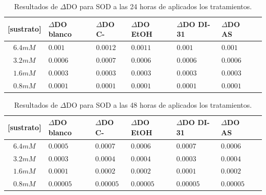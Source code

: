 \begin{table}[h]
	\caption{Resultados de $\Delta$DO para SOD a las 24 horas de aplicados los tratamientos.}
	\label{24hSOD}
	\begin{center}
		\begin{tabular}{|c|M{25mm}|M{25mm}|M{25mm}|M{25mm}|M{25mm}|c|}
			\hline 
			\textbf{[sustrato]} & \textbf{$\Delta$DO blanco} & \textbf{$\Delta$DO C-} & \textbf{$\Delta$DO EtOH} & \textbf{$\Delta$DO DI-31} & \textbf{$\Delta$DO AS} \\ 
			\hline 
			$6.4mM$ &  $0.001$ & $0.0012$  & $0.0011$ & $0.001$ & $0.001$ \\ 
			\hline 
			$3.2mM$ &  $0.0006$ & $0.0007$  & $0.0006$ & $0.0006$ & $0.0006$ \\ 
			\hline 
			$1.6mM$ &  $0.0003$ & $0.0003$  & $0.0003$ & $0.0003$ & $0.0003$ \\
			\hline 
			$0.8mM$ &  $0.0001$ & $0.0001$  & $0.0001$ & $0.0001$ & $0.0001$ \\
			\hline
		\end{tabular} 
	\end{center}
\end{table}

\normalsize

\begin{table}[h]
	\caption{Resultados de $\Delta$DO para SOD a las 48 horas de aplicados los tratamientos.}
	\label{48hSOD}
	\begin{center}
		\begin{tabular}{|c|M{25mm}|M{25mm}|M{25mm}|M{25mm}|M{25mm}|c|}
			\hline 
			\textbf{[sustrato]} & \textbf{$\Delta$DO blanco} & \textbf{$\Delta$DO C-} & \textbf{$\Delta$DO EtOH} & \textbf{$\Delta$DO DI-31} & \textbf{$\Delta$DO AS} \\ 
			\hline 
			$6.4mM$ &  $0.0005$ & $0.0007$  & $0.0006$ & $0.0007$ & $0.0006$ \\ 
			\hline 
			$3.2mM$ &  $0.0003$ & $0.0004$  & $0.0004$ & $0.0003$ & $0.0004$ \\ 
			\hline 
			$1.6mM$ &  $0.0001$ & $0.0002$  & $0.0002$ & $0.0001$ & $0.0002$ \\
			\hline 
			$0.8mM$ &  $0.00005$ & $0.00005$  & $0.00005$ & $0.00005$ & $0.00005$ \\
			\hline
		\end{tabular} 
	\end{center}
\end{table}

\normalsize


